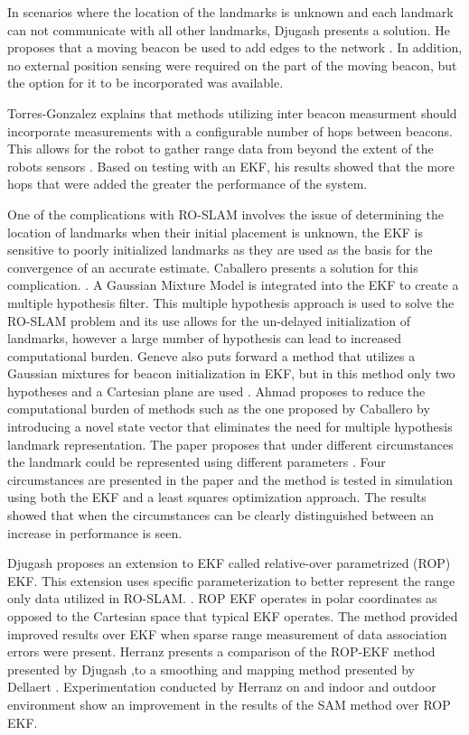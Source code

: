 \documentclass[conference]{IEEEtran}
\begin{document}
In scenarios where the location of the landmarks is unknown and each landmark can not communicate with all other landmarks, Djugash presents a solution. He proposes that a moving beacon be used to add edges to the network \cite{Djugash2006}. In addition, no external position sensing were required on the part of the moving beacon, but the option for it to be incorporated was available. 

Torres-Gonzalez explains that methods utilizing inter beacon measurment should incorporate measurements with a configurable number of hops between beacons. This allows for the robot to gather range data from beyond the extent of the robots sensors \cite{Torres-Gonzalez2015}. Based on testing with an EKF, his results showed that the more hops that were added the greater the performance of the system. 

One of the complications with RO-SLAM involves the issue of determining the location of landmarks when their initial placement is unknown, the EKF is sensitive to poorly initialized landmarks as they are used as the basis for the convergence of an accurate estimate. Caballero presents a solution for this complication. \cite{Caballero2010}. A Gaussian Mixture Model is integrated into the EKF to create a multiple hypothesis filter.  This multiple hypothesis approach is used to solve the RO-SLAM problem and its use allows for the un-delayed initialization of landmarks, however a large number of hypothesis can lead to increased computational burden. Geneve
also puts forward a method that utilizes a Gaussian mixtures for beacon initialization in EKF, but in this method only two hypotheses and a Cartesian plane are used \cite{Geneve2015}.  Ahmad proposes to reduce the computational burden of methods such as the one proposed by Caballero \cite{Caballero2010} by introducing a novel state vector that eliminates the need for multiple hypothesis landmark representation. The paper proposes that under different circumstances the landmark could be represented using different parameters  \cite{Ahmad2011a}. Four circumstances are presented in the paper and the method is tested in simulation using both the EKF and a least squares optimization approach. The results showed that when the circumstances can be clearly distinguished between an increase in performance is seen.

Djugash proposes an extension to EKF called relative-over parametrized (ROP) EKF. This extension uses specific parameterization to  better represent the range only data utilized in RO-SLAM. \cite{Djugash2008}. ROP EKF operates in polar coordinates as opposed to the Cartesian space that typical EKF operates. The method provided improved results over EKF when sparse range measurement of data association errors were present. Herranz presents a comparison of the ROP-EKF method presented by Djugash \cite{Djugash2008},to a smoothing and mapping method presented by Dellaert \cite{Dellaert2006}. Experimentation conducted by Herranz on and indoor and outdoor environment show an improvement in the results of the SAM method over ROP EKF. \cite{Herranz2014}
\end{document}
